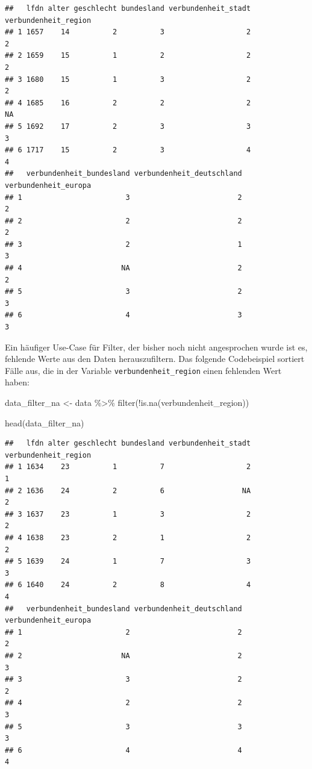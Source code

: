 \documentclass[
]{book}
\newenvironment{Shaded}{\begin{snugshade}}{\end{snugshade}}
\newcommand{\FunctionTok}[1]{\textcolor[rgb]{0.00,0.00,0.00}{#1}}
\newcommand{\NormalTok}[1]{#1}
\newcommand{\OtherTok}[1]{\textcolor[rgb]{0.56,0.35,0.01}{#1}}
\newcommand{\SpecialCharTok}[1]{\textcolor[rgb]{0.00,0.00,0.00}{#1}}
\begin{document}
\begin{verbatim}
##   lfdn alter geschlecht bundesland verbundenheit_stadt verbundenheit_region
## 1 1657    14          2          3                   2                    2
## 2 1659    15          1          2                   2                    2
## 3 1680    15          1          3                   2                    2
## 4 1685    16          2          2                   2                   NA
## 5 1692    17          2          3                   3                    3
## 6 1717    15          2          3                   4                    4
##   verbundenheit_bundesland verbundenheit_deutschland verbundenheit_europa
## 1                        3                         2                    2
## 2                        2                         2                    2
## 3                        2                         1                    3
## 4                       NA                         2                    2
## 5                        3                         2                    3
## 6                        4                         3                    3
\end{verbatim}

Ein häufiger Use-Case für Filter, der bisher noch nicht angesprochen wurde ist es, fehlende Werte aus den Daten herauszufiltern. Das folgende Codebeispiel sortiert Fälle aus, die in der Variable \texttt{verbundenheit\_region} einen fehlenden Wert haben:

\begin{Shaded}
\begin{Highlighting}[]
\NormalTok{data\_filter\_na }\OtherTok{\textless{}{-}}\NormalTok{ data }\SpecialCharTok{\%\textgreater{}\%} 
  \FunctionTok{filter}\NormalTok{(}\SpecialCharTok{!}\FunctionTok{is.na}\NormalTok{(verbundenheit\_region))}

\FunctionTok{head}\NormalTok{(data\_filter\_na)}
\end{Highlighting}
\end{Shaded}

\begin{verbatim}
##   lfdn alter geschlecht bundesland verbundenheit_stadt verbundenheit_region
## 1 1634    23          1          7                   2                    1
## 2 1636    24          2          6                  NA                    2
## 3 1637    23          1          3                   2                    2
## 4 1638    23          2          1                   2                    2
## 5 1639    24          1          7                   3                    3
## 6 1640    24          2          8                   4                    4
##   verbundenheit_bundesland verbundenheit_deutschland verbundenheit_europa
## 1                        2                         2                    2
## 2                       NA                         2                    3
## 3                        3                         2                    2
## 4                        2                         2                    3
## 5                        3                         3                    3
## 6                        4                         4                    4
\end{verbatim}
\end{document}
